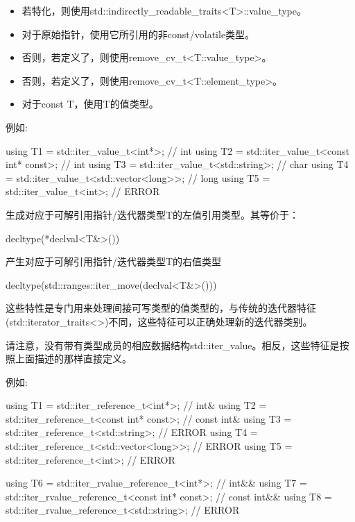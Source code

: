 \begin{itemize}
\item 
若特化，则使用std::indirectly\_readable\_traits<T>::value\_type。

\item 
对于原始指针，使用它所引用的非const/volatile类型。

\item 
否则，若定义了，则使用remove\_cv\_t<T::value\_type>。

\item 
否则，若定义了，则使用remove\_cv\_t<T::element\_type>。

\item 
对于const T，使用T的值类型。
\end{itemize}

例如:

\begin{cpp}
using T1 = std::iter_value_t<int*>; // int
using T2 = std::iter_value_t<const int* const>; // int
using T3 = std::iter_value_t<std::string>; // char
using T4 = std::iter_value_t<std::vector<long>>; // long
using T5 = std::iter_value_t<int>; // ERROR
\end{cpp}



生成对应于可解引用指针/迭代器类型T的左值引用类型。其等价于：

\begin{cpp}
decltype(*declval<T&>())
\end{cpp}


产生对应于可解引用指针/迭代器类型T的右值类型

\begin{cpp}
decltype(std::ranges::iter_move(declval<T&>()))
\end{cpp}

这些特性是专门用来处理间接可写类型的值类型的，与传统的迭代器特征(std::iterator\_traits<>)不同，这些特征可以正确处理新的迭代器类别。

请注意，没有带有类型成员的相应数据结构std::iter\_value。相反，这些特征是按照上面描述的那样直接定义。

例如:

\begin{cpp}
using T1 = std::iter_reference_t<int*>; // int&
using T2 = std::iter_reference_t<const int* const>; // const int&
using T3 = std::iter_reference_t<std::string>; // ERROR
using T4 = std::iter_reference_t<std::vector<long>>; // ERROR
using T5 = std::iter_reference_t<int>; // ERROR

using T6 = std::iter_rvalue_reference_t<int*>; // int&&
using T7 = std::iter_rvalue_reference_t<const int* const>; // const int&&
using T8 = std::iter_rvalue_reference_t<std::string>; // ERROR
\end{cpp}












